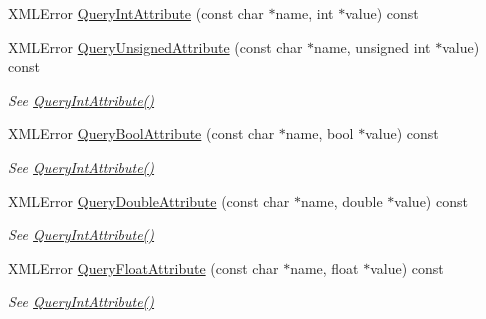 \begin{DoxyCompactItemize}
X\+M\+L\+Error \hyperlink{classtinyxml2_1_1XMLElement_a8a78bc1187c1c45ad89f2690eab567b1}{Query\+Int\+Attribute} (const char $\ast$name, int $\ast$value) const
\item 
\mbox{\label{classtinyxml2_1_1XMLElement_a26fc84cbfba6769dafcfbf256c05e22f}} 
X\+M\+L\+Error \hyperlink{classtinyxml2_1_1XMLElement_a26fc84cbfba6769dafcfbf256c05e22f}{Query\+Unsigned\+Attribute} (const char $\ast$name, unsigned int $\ast$value) const
\begin{DoxyCompactList}\small\item\em See \hyperlink{classtinyxml2_1_1XMLElement_a8a78bc1187c1c45ad89f2690eab567b1}{Query\+Int\+Attribute()} \end{DoxyCompactList}\item 
\mbox{\label{classtinyxml2_1_1XMLElement_a14c1bb77c39689838be01838d86ca872}} 
X\+M\+L\+Error \hyperlink{classtinyxml2_1_1XMLElement_a14c1bb77c39689838be01838d86ca872}{Query\+Bool\+Attribute} (const char $\ast$name, bool $\ast$value) const
\begin{DoxyCompactList}\small\item\em See \hyperlink{classtinyxml2_1_1XMLElement_a8a78bc1187c1c45ad89f2690eab567b1}{Query\+Int\+Attribute()} \end{DoxyCompactList}\item 
\mbox{\label{classtinyxml2_1_1XMLElement_a5f0964e2dbd8e2ee7fce9beab689443c}} 
X\+M\+L\+Error \hyperlink{classtinyxml2_1_1XMLElement_a5f0964e2dbd8e2ee7fce9beab689443c}{Query\+Double\+Attribute} (const char $\ast$name, double $\ast$value) const
\begin{DoxyCompactList}\small\item\em See \hyperlink{classtinyxml2_1_1XMLElement_a8a78bc1187c1c45ad89f2690eab567b1}{Query\+Int\+Attribute()} \end{DoxyCompactList}\item 
\mbox{\label{classtinyxml2_1_1XMLElement_acd5eeddf6002ef90806af794b9d9a5a5}} 
X\+M\+L\+Error \hyperlink{classtinyxml2_1_1XMLElement_acd5eeddf6002ef90806af794b9d9a5a5}{Query\+Float\+Attribute} (const char $\ast$name, float $\ast$value) const
\begin{DoxyCompactList}\small\item\em See \hyperlink{classtinyxml2_1_1XMLElement_a8a78bc1187c1c45ad89f2690eab567b1}{Query\+Int\+Attribute()} \end{DoxyCompactList}\item 

\end{DoxyCompactItemize}
